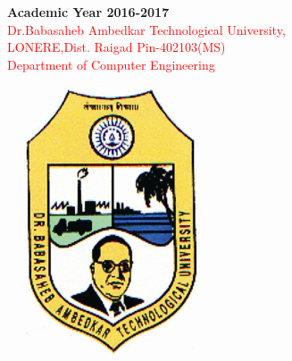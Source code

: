 \documentclass[12 pt,a4paper]{report}
\begin{document}
\newpage
{}
\lhead{ }
\cfoot{ }
\hspace{0.2 cm}
\center\textbf{Academic Year 2016-2017}
\vspace{0.5 cm}
\\
\flushleft 
{\large \textcolor{Red}{Dr.Babasaheb Ambedkar Technological University,}}
 \\
{\large \textcolor{Red}{LONERE,Dist. Raigad Pin-402103(MS)}}
 \\
{\large \textcolor{Red}{Department of Computer Engineering}}  
 \\
 \begin{center}
 \flushright
 \vspace{-3 cm}
\includegraphics[scale=.7]{logo.png}
\end{center}
\end{document}
